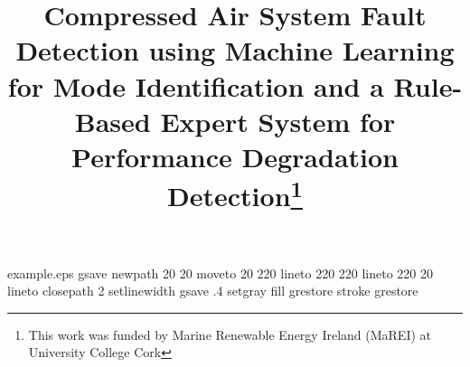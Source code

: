 %
%
%
%
%
\begin{filecontents*}{example.eps}
gsave
newpath
  20 20 moveto
  20 220 lineto
  220 220 lineto
  220 20 lineto
closepath
2 setlinewidth
gsave
  .4 setgray fill
grestore
stroke
grestore
\end{filecontents*}
%
\RequirePackage{fix-cm}
%
\documentclass[twocolumn, natbib]{svjour3}          %
%
\smartqed  %
%
\usepackage{graphicx}
%
\usepackage{mathptmx}      %
%
%
\usepackage{hyperref}



\usepackage{booktabs}
\usepackage{multirow}
\usepackage{tabularx}
\usepackage{longtable}
\usepackage{lipsum}
\usepackage{lscape}
\usepackage{siunitx}
\usepackage{amsmath}
\usepackage{rotating}
%
%


\title{Compressed Air System Fault Detection using Machine Learning for Mode Identification and a Rule-Based Expert System for Performance Degradation Detection\thanks{This work was funded by Marine Renewable Energy Ireland (MaREI) at University College Cork}
}

